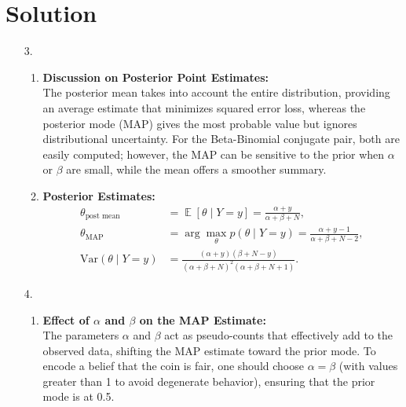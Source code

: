 \documentclass[submit]{../harvardml}
\newenvironment{answer}
  {\section*{Solution}}
{}
\DeclareMathOperator*{\mean}{\mathbb{E}}
\begin{document}
\begin{answer}
\begin{enumerate}
    \item[3.]
      \begin{enumerate}
        \item \textbf{Discussion on Posterior Point Estimates:}\\[1mm]
              The posterior mean takes into account the entire distribution, providing an average estimate that minimizes squared error loss, whereas the posterior mode (MAP) gives the most probable value but ignores distributional uncertainty. For the Beta-Binomial conjugate pair, both are easily computed; however, the MAP can be sensitive to the prior when \(\alpha\) or \(\beta\) are small, while the mean offers a smoother summary.
              
        \item \textbf{Posterior Estimates:}\\[1mm]
              \begin{align*}
                \theta_{\text{post mean}} &= \mean[\theta\mid Y=y] = \frac{\alpha+y}{\alpha+\beta+N},\\[1mm]
                \theta_{\text{MAP}} &= \arg\max_{\theta} p(\theta\mid Y=y) = \frac{\alpha+y-1}{\alpha+\beta+N-2},\\[1mm]
                \mathrm{Var}(\theta\mid Y=y) &= \frac{(\alpha+y)(\beta+N-y)}{(\alpha+\beta+N)^2(\alpha+\beta+N+1)}.
              \end{align*}
      \end{enumerate}

    \item[4.]
      \begin{enumerate}
        \item \textbf{Effect of \(\alpha\) and \(\beta\) on the MAP Estimate:}\\[1mm]
              The parameters \(\alpha\) and \(\beta\) act as pseudo-counts that effectively add to the observed data, shifting the MAP estimate toward the prior mode. To encode a belief that the coin is fair, one should choose \(\alpha = \beta\) (with values greater than 1 to avoid degenerate behavior), ensuring that the prior mode is at 0.5.
              

\end{enumerate}
\end{enumerate}
\end{answer}
\end{document}
